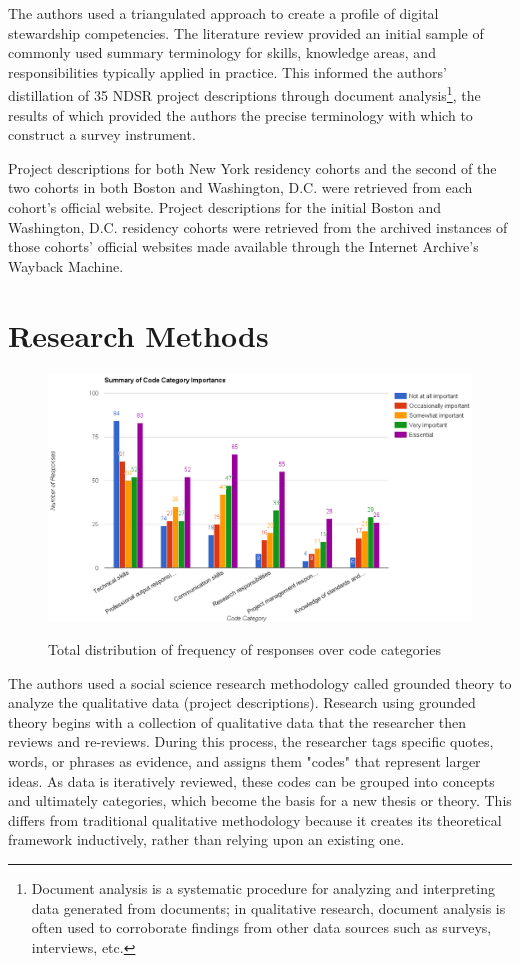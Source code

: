 \documentclass{acm_proc_article-sp}
\begin{document}
The authors used a triangulated approach to create a profile of digital stewardship competencies. The literature review provided an initial sample of commonly used summary terminology for skills, knowledge areas, and responsibilities typically applied in practice. This informed the authors' distillation of 35 NDSR project descriptions through document analysis\footnote{Document analysis is a systematic procedure for analyzing and interpreting data generated from documents; in qualitative research, document analysis is often used to corroborate findings from other data sources such as surveys, interviews, etc.\cite{22}}, the results of which provided the authors the precise terminology with which to construct a survey instrument. 

Project descriptions for both New York residency cohorts\cite{23} and the second of the two cohorts in both Boston\cite{24} and Washington, D.C.\cite{25} were retrieved from each cohort's official website. Project descriptions for the initial Boston\cite{26} and Washington, D.C.\cite{27} residency cohorts were retrieved from the archived instances of those cohorts' official websites made available through the Internet Archive's Wayback Machine.  

\section{Research Methods}
\begin{figure}[!t]
  \includegraphics[scale=0.5]{total_skills.png} 
   \label{Figure 1.}   
    \caption{Total distribution of frequency of responses over code categories}
\end{figure}

The authors used a social science research methodology called grounded theory\cite{28} to analyze the qualitative data (project descriptions). Research using grounded theory begins with a collection of qualitative data that the researcher then reviews and re-reviews. During this process, the researcher tags specific quotes, words, or phrases as evidence, and assigns them "codes" that represent larger ideas.\cite{29} As data is iteratively reviewed, these codes can be grouped into concepts and ultimately categories, which become the basis for a new thesis or theory. This differs from traditional qualitative methodology because it creates its theoretical framework inductively, rather than relying upon an existing one.\cite{30}
\end{document}
